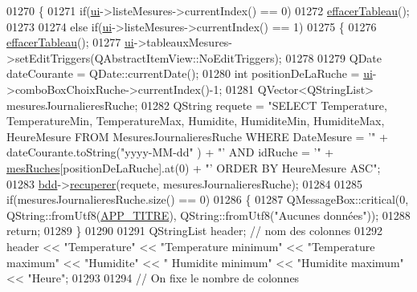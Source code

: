 \begin{DoxyCode}
01270 \{
01271     \textcolor{keywordflow}{if}(\hyperlink{class_ruche_ihm_a64786058bd7f88ca2f1e9743bb27c25b}{ui}->listeMesures->currentIndex() == 0)
01272         \hyperlink{class_ruche_ihm_a386868ba4e6e37b9d877fe3ab330e605}{effacerTableau}();
01273 
01274     \textcolor{keywordflow}{else} \textcolor{keywordflow}{if}(\hyperlink{class_ruche_ihm_a64786058bd7f88ca2f1e9743bb27c25b}{ui}->listeMesures->currentIndex() == 1)
01275     \{
01276         \hyperlink{class_ruche_ihm_a386868ba4e6e37b9d877fe3ab330e605}{effacerTableau}();
01277         \hyperlink{class_ruche_ihm_a64786058bd7f88ca2f1e9743bb27c25b}{ui}->tableauxMesures->setEditTriggers(QAbstractItemView::NoEditTriggers);
01278 
01279         QDate dateCourante = QDate::currentDate();
01280         \textcolor{keywordtype}{int} positionDeLaRuche = \hyperlink{class_ruche_ihm_a64786058bd7f88ca2f1e9743bb27c25b}{ui}->comboBoxChoixRuche->currentIndex()-1;
01281         QVector<QStringList> mesuresJournalieresRuche;
01282         QString requete = \textcolor{stringliteral}{"SELECT Temperature, TemperatureMin, TemperatureMax, Humidite, HumiditeMin,
       HumiditeMax, HeureMesure FROM MesuresJournalieresRuche WHERE DateMesure = '"} + dateCourante.toString(\textcolor{stringliteral}{"yyyy-MM-dd"}
      ) + \textcolor{stringliteral}{"' AND idRuche = '"} + \hyperlink{class_ruche_ihm_ab7741fa67b19cbb2da7eb12c58cf83c1}{mesRuches}[positionDeLaRuche].at(0) + \textcolor{stringliteral}{"' ORDER BY HeureMesure ASC"};
01283         \hyperlink{class_ruche_ihm_a0851936fe212e8d40538264f09749153}{bdd}->\hyperlink{class_base_de_donnees_a77539baad389f5acf754cd2cd452403e}{recuperer}(requete, mesuresJournalieresRuche);
01284 
01285         \textcolor{keywordflow}{if}(mesuresJournalieresRuche.size() == 0)
01286         \{
01287             QMessageBox::critical(0, QString::fromUtf8(\hyperlink{parametres_8h_ace364d1ce44aa9f79bcff6e3752c4a5f}{APP\_TITRE}), QString::fromUtf8(\textcolor{stringliteral}{"Aucunes
       données"}));
01288             \textcolor{keywordflow}{return};
01289         \}
01290 
01291         QStringList header; \textcolor{comment}{// nom des colonnes}
01292         header << \textcolor{stringliteral}{"Temperature"} << \textcolor{stringliteral}{"Temperature minimum"} << \textcolor{stringliteral}{"Temperature maximum"} << \textcolor{stringliteral}{"Humidite"} << \textcolor{stringliteral}{"
      Humidite minimum"} << \textcolor{stringliteral}{"Humidite maximum"}  << \textcolor{stringliteral}{"Heure"};
01293 
01294         \textcolor{comment}{// On fixe le nombre de colonnes}

\end{DoxyCode}
